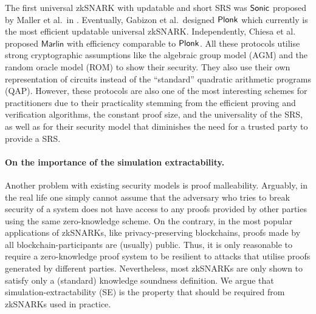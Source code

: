 \documentclass[runningheads,11pt]{llncs}
\theoremstyle{definition} \newtheorem{definition}[theorem]{Definition}
\begin{document}
The first universal zkSNARK with updatable and short SRS was ${\textnormal{\textsf{Sonic}}}$ proposed
by Maller et al.~in \cite{CCS:MBKM19}. Eventually, Gabizon et al.~designed
$\textnormal{\textsf{Plonk}}$ \cite{EPRINT:GabWilCio19} which currently is the most efficient
updatable universal zkSNARK. Independently, Chiesa et al.~\cite{EC:CHMMVW20}
proposed $\textsf{Marlin}$ with efficiency comparable to $\textnormal{\textsf{Plonk}}$.
%
All these protocols utilise strong cryptographic assumptions like the algebraic
group model (AGM) and the random oracle model (ROM) to show their security. They
also use their own representation of circuits instead of the ``standard''
quadratic arithmetic programs (QAP). However, these protocols are also one of
the most interesting schemes for practitioners due to their practicality
stemming from the efficient proving and verification algorithms, the constant proof size, and the
universality of the SRS, as well as for their security model that diminishes the
need for a trusted party to provide a SRS.


\paragraph{On the importance of the simulation extractability.}
Another problem with existing security models is proof malleability.
Arguably, in the real
life one simply cannot assume that the adversary who tries to break security of
a system does not have access to any proofs provided by other parties using the
same zero-knowledge scheme. On the contrary, in the most popular applications of
zkSNARKs, like privacy-preserving blockchains, proofs made by all
blockchain-participants are (usually) public. Thus, it is only reasonable to
require a zero-knowledge proof system to be resilient to attacks that utilise
proofs generated by different parties.
Nevertheless, most zkSNARKs are only shown to satisfy only a (standard) knowledge soundness definition. We argue that simulation-extractability (SE) is the property that should be required from zkSNARKs used in practice. 
\end{document}
